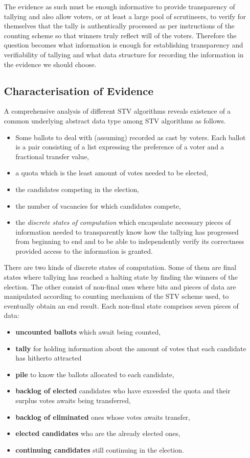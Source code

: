 \documentclass[10pt,conference]{IEEEtran}
\begin{document}
  
The evidence as such must be enough informative to provide transparency of tallying and also allow  voters, or at least a large pool of scrutineers, to verify for themselves that the tally is authentically processed as per instructions of the counting scheme  so that winners truly reflect will of the voters. Therefore the question becomes what information is enough  for establishing transparency and verifiability of tallying  and what data structure for recording the information in the evidence we should choose.
\subsection{Characterisation of Evidence} 
A comprehensive analysis of different STV algorithms reveals existence of a common underlying abstract data type among STV algorithms as follows. 
\begin{itemize}
\item Some ballots to deal with (assuming) recorded as cast by voters. Each ballot is a pair consisting of a list expressing the preference of a voter and a fractional transfer value,
\item a quota which is the least amount of votes needed to be elected, 
\item the candidates competing in the election, 
\item the number of vacancies for which candidates compete,
\item the \emph{discrete states of computation} which encapsulate necessary  pieces of information needed to transparently know how the tallying has progressed from beginning to end and to be able to independently verify its correctness provided access to the information is granted. 
\end{itemize}
There are two kinds of discrete states of computation. Some of them are final states where tallying has reached a halting state by finding the winners of the election. The other consist of non-final ones where bits and pieces of data are manipulated according to counting mechanism of the STV scheme used, to eventually obtain an end result. Each non-final state comprises seven pieces of data: 
\begin{itemize}
 \item\textbf{uncounted ballots} which await being counted,
 \item\textbf{tally} for holding information about the amount of votes that each candidate has hitherto attracted %
 \item\textbf{pile} to know the ballots allocated to each candidate, 
 \item\textbf{backlog of elected} candidates who have exceeded the quota and their surplus votes awaits being transferred,
 \item\textbf{backlog of eliminated} ones whose votes awaits transfer,
 \item\textbf{elected candidates} who are the already elected ones,%
 \item\textbf{continuing candidates} still continuing in the election. 
 \end{itemize}
\end{document}
